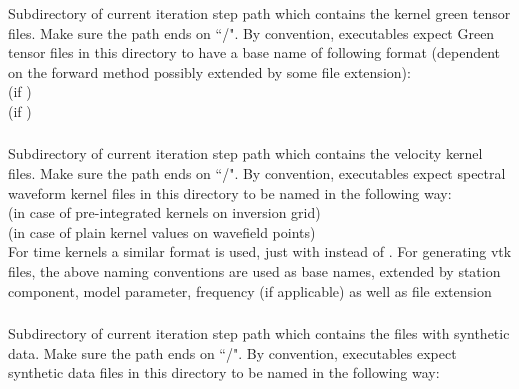 \subsubsection{} 
Subdirectory of current iteration step path
 which contains the 
kernel green tensor files. Make sure the path ends on ``/".
By convention, \ASKI{} executables expect Green tensor files in this directory to have a base name 
of following format (dependent on the forward method possibly extended by some file extension):\\
 (if )\\
 (if )
\subsubsection{} 
Subdirectory of current iteration step path
 which contains the 
velocity kernel files. Make sure the path ends on ``/".
By convention, \ASKI{} executables expect spectral waveform kernel files in this directory to 
be named in the following way:\\
 (in case of pre-integrated kernels on inversion grid)\\
 (in case of plain kernel values on wavefield points)\\
For time kernels a similar format is used, just with  instead of .
For generating vtk files, the above naming conventions are used as base names, extended by station component, 
model parameter, frequency (if applicable) as well as file extension 
\subsubsection{} 
Subdirectory of current iteration step path
 which contains the 
files with synthetic data. Make sure the path ends on ``/".
By convention, \ASKI{} executables expect synthetic data files in this directory to 
be named in the following way:\\
